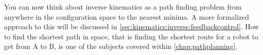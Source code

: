 You can now think about inverse kinematics as a path finding problem from anywhere in the configuration space to the nearest minima. A more formalized approach to this will be discussed in \cref{sec:kinematics:inverse:feedbackcontrol}. How to find the shortest path in space, that is finding the shortest route for a robot to get from A to B, is one of the subjects covered within \cref{chap:pathplanning}.


